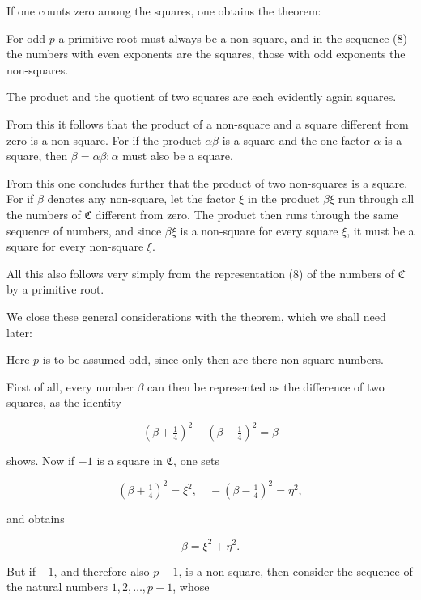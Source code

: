 If one counts zero among the squares, one obtains the theorem:


For odd $p$ a primitive root must always be a non-square, and in the sequence (8) the numbers with even exponents are the squares, those with odd exponents the non-squares.

The product and the quotient of two squares are each evidently again squares.

From this it follows that the product of a non-square and a square different from zero is a non-square. For if the product $\alpha\beta$ is a square and the one factor $\alpha$ is a square, then $\beta = \alpha\beta : \alpha$ must also be a square.

From this one concludes further that the product of two non-squares is a square. For if $\beta$ denotes any non-square, let the factor $\xi$ in the product $\beta\xi$ run through all the numbers of $\mathfrak{C}$ different from zero. The product then runs through the same sequence of numbers, and since $\beta\xi$ is a non-square for every square $\xi$, it must be a square for every non-square $\xi$.

All this also follows very simply from the representation (8) of the numbers of $\mathfrak{C}$ by a primitive root.

We close these general considerations with the theorem, which we shall need later:


Here $p$ is to be assumed odd, since only then are there non-square numbers.

First of all, every number $\beta$ can then be represented as the difference of two squares, as the identity

\[
\left(\beta + \tfrac{1}{4}\right)^2 - \left(\beta - \tfrac{1}{4}\right)^2 = \beta
\]

shows. Now if $-1$ is a square in $\mathfrak{C}$, one sets

\[
\left(\beta + \tfrac{1}{4}\right)^2 = \xi^2, \quad -\left(\beta - \tfrac{1}{4}\right)^2 = \eta^2,
\]

and obtains

\[
\beta = \xi^2 + \eta^2.
\]

But if $-1$, and therefore also $p - 1$, is a non-square, then consider the sequence of the natural numbers $1, 2, \ldots, p - 1$, whose
